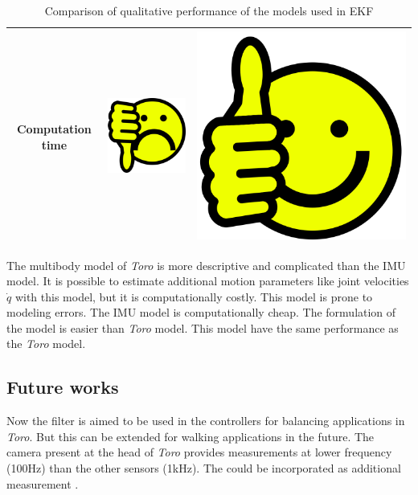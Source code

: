 \begin{table}
\begin{tabular}{|c|c|c|}
	Computation time &\includegraphics{Bilder/thumbs-down.png} &\includegraphics[scale=0.025]{Bilder/thumbs-up.png} \\ \hline
	\end{tabular}
	\caption{Comparison of qualitative performance of the models used in EKF }
\end{table}

The multibody model of \emph{Toro} is more descriptive and complicated than the IMU model. It is possible to estimate additional motion parameters like joint velocities $\dot q$ with this model, but it is computationally costly. This model is prone to modeling errors. The IMU model is computationally cheap. The formulation of the model is easier than \emph{Toro} model. This model have the same performance as the \emph{Toro} model.

\subsection{Future works}
Now the filter is aimed to be used in the controllers for balancing applications in \emph{Toro}. But this can be extended for walking applications in the future. The camera present at the head of \emph{Toro} provides measurements at lower frequency (100Hz) than the other sensors (1kHz). The could be incorporated as additional measurement \citep{vis12}.